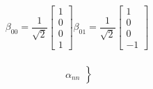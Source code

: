 \begin{frame}
    \frametitle{}
\[ \beta_{00}=\frac{1}{\sqrt{2}}
\begin{bmatrix}
    1 \\ 
    0 \\  
    0 \\ 
    1 
\end{bmatrix} \beta_{01}=\frac{1}{\sqrt{2}}
\begin{bmatrix}
    1 \\ 
    0 \\  
    0 \\ 
    -1 
\end{bmatrix}  \]
\end{frame}

\begin{frame}
    \frametitle{}
$$ 
\left.
\begin{array}{r}
   \\
  \alpha_{nn} 
\end{array}\right\} 
$$

\end{frame}   

\begin{frame}
    \frametitle{}

\end{frame}
